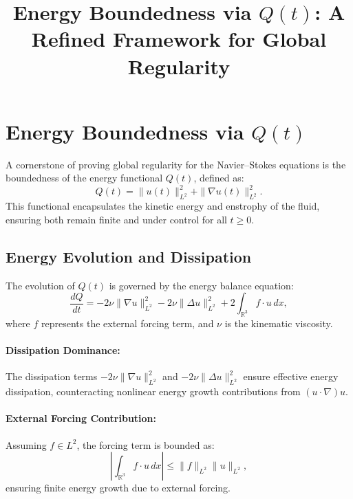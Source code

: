 \documentclass[12pt]{article}
\theoremstyle{definition}
\begin{document}
\title{Energy Boundedness via $Q(t)$: A Refined Framework for Global Regularity}
\author{}
\date{}
\maketitle

\section{Energy Boundedness via $Q(t)$}

A cornerstone of proving global regularity for the Navier--Stokes equations is the boundedness of the energy functional $Q(t)$, defined as:
\begin{equation}
Q(t) = \|u(t)\|_{L^2}^2 + \|\nabla u(t)\|_{L^2}^2.
\label{eq:qt_definition}
\end{equation}
This functional encapsulates the kinetic energy and enstrophy of the fluid, ensuring both remain finite and under control for all $t \geq 0$.

\subsection{Energy Evolution and Dissipation}
The evolution of $Q(t)$ is governed by the energy balance equation:
\begin{equation}
\frac{dQ}{dt} = -2\nu \|\nabla u\|_{L^2}^2 - 2\nu \|\Delta u\|_{L^2}^2 + 2 \int_{\mathbb{R}^3} f \cdot u \, dx,
\label{eq:energy_evolution}
\end{equation}
where $f$ represents the external forcing term, and $\nu$ is the kinematic viscosity.

\paragraph{Dissipation Dominance:}
The dissipation terms $-2\nu \|\nabla u\|_{L^2}^2$ and $-2\nu \|\Delta u\|_{L^2}^2$ ensure effective energy dissipation, counteracting nonlinear energy growth contributions from $(u \cdot \nabla)u$.

\paragraph{External Forcing Contribution:}
Assuming $f \in L^2$, the forcing term is bounded as:
\begin{equation}
\left| \int_{\mathbb{R}^3} f \cdot u \, dx \right| \leq \|f\|_{L^2} \|u\|_{L^2},
\end{equation}
ensuring finite energy growth due to external forcing.
\end{document}

